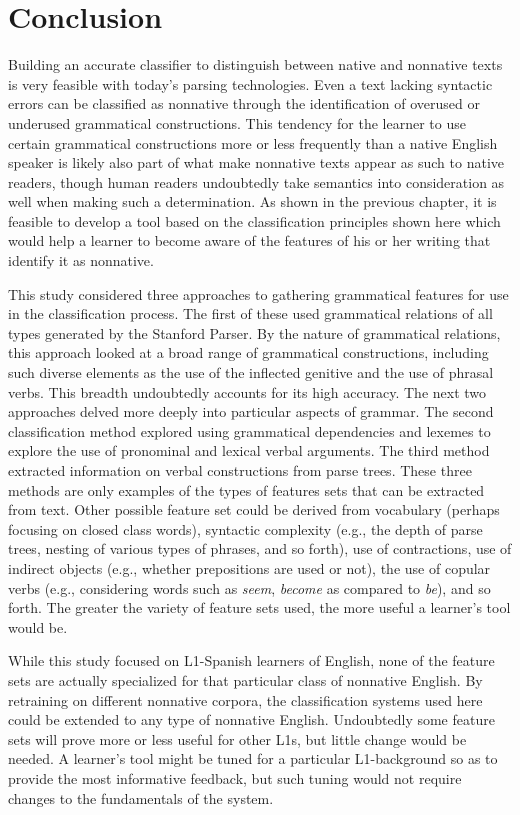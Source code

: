 \documentclass[main.tex]{subfiles}
\begin{document}
\section{Conclusion}

Building an accurate classifier to distinguish between native and nonnative texts is very feasible with today's parsing technologies. Even a text lacking syntactic errors can be classified as nonnative through the identification of overused or underused grammatical constructions. This tendency for the learner to use certain grammatical constructions more or less frequently than a native English speaker is likely also part of what make nonnative texts appear as such to native readers, though human readers undoubtedly take semantics into consideration as well when making such a determination. As shown in the previous chapter, it is feasible to develop a tool based on the classification principles shown here which would help a learner to become aware of the features of his or her writing that identify it as nonnative.

This study considered three approaches to gathering grammatical features for use in the classification process. The first of these used grammatical relations of all types generated by the Stanford Parser. By the nature of grammatical relations, this approach looked at a broad range of grammatical constructions, including such diverse elements as the use of the inflected genitive and the use of phrasal verbs. This breadth undoubtedly accounts for its high accuracy. The next two approaches delved more deeply into particular aspects of grammar. The second classification method explored using grammatical dependencies and lexemes to explore the use of pronominal and lexical verbal arguments. The third method extracted information on verbal constructions from parse trees. These three methods are only examples of the types of features sets that can be extracted from text. Other possible feature set could be derived from vocabulary (perhaps focusing on closed class words), syntactic complexity (e.g., the depth of parse trees, nesting of various types of phrases, and so forth), use of contractions, use of indirect objects (e.g., whether prepositions are used or not), the use of copular verbs (e.g., considering words such as \textit{seem}, \textit{become} as compared to \textit{be}), and so forth. The greater the variety of feature sets used, the more useful a learner's tool would be.

While this study focused on L1-Spanish learners of English, none of the feature sets are actually specialized for that particular class of nonnative English. By retraining on different nonnative corpora, the classification systems used here could be extended to any type of nonnative English. Undoubtedly some feature sets will prove more or less useful for other L1s, but little change would be needed. A learner's tool might be tuned for a particular L1-background so as to provide the most informative feedback, but such tuning would not require changes to the fundamentals of the system.
\end{document}
